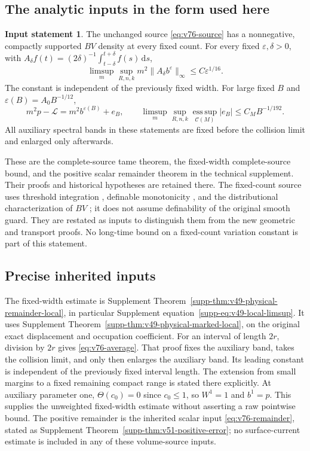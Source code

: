 \documentclass[11pt,reqno]{amsart}
\numberwithin{equation}{section}
\theoremstyle{definition}\newtheorem{definition}[theorem]{Definition}
\theoremstyle{remark}\newtheorem{remark}[theorem]{Remark}
\newcommand{\dd}{\,\mathrm d}\newcommand{\one}{\mathbf1}
\theoremstyle{definition}\newtheorem{inputstatement}[theorem]{Input statement}
\newcommand{\esssup}{\operatorname*{ess\,sup}}
\begin{document}
\subsection{The analytic inputs in the form used here}
\begin{inputstatement}\label{input:v76-analytic}
The unchanged source \eqref{eq:v76-source} has a nonnegative,
compactly supported $BV$ density at every fixed count. For every
fixed $\varepsilon,\delta>0$, with
$A_\delta f(t)=(2\delta)^{-1}\int_{t-\delta}^{t+\delta}f(s)\dd s$,
\begin{equation}\label{eq:v76-average}
 \limsup_m\sup_{R,n,k}m^2\|A_\delta b^\varepsilon\|_\infty
                                      \le C\varepsilon^{1/16}.
\end{equation}
The constant is independent of the previously fixed width. For large
fixed $B$ and $\varepsilon(B)=A_0B^{-1/12}$,
\begin{equation}\label{eq:v76-remainder}
 m^2p-\mathcal L=m^2b^{\varepsilon(B)}+e_B,\qquad
 \limsup_m\sup_{R,n,k}\esssup_{\mathcal C(M)}|e_B|
                                     \le C_MB^{-1/192}.
\end{equation}
All auxiliary spectral bands in these statements are fixed before
the collision limit and enlarged only afterwards.
\end{inputstatement}
These are the complete-source tame theorem, the fixed-width
complete-source bound, and the positive scalar remainder theorem in
the technical supplement. Their proofs and historical hypotheses are
retained there. The fixed-count source uses threshold integration
\cite{CMInt}, definable monotonicity \cite{Coste}, and the
distributional characterization of $BV$ \cite{AFP}; it does not
assume definability of the original smooth guard. They are restated as inputs to distinguish them from
the new geometric and transport proofs. No long-time bound on a
fixed-count variation constant is part of this statement.



\subsection{Precise inherited inputs}\label{sec:v79-input-map}
The fixed-width estimate is Supplement Theorem~\ref{supp-thm:v49-physical-remainder-local},
in particular Supplement equation~\eqref{supp-eq:v49-local-limsup}.
It uses Supplement Theorem~\ref{supp-thm:v49-physical-marked-local}, on the
original exact displacement and occupation coefficient. For an interval
of length $2r$, division by $2r$ gives \eqref{eq:v76-average}. That
proof fixes the auxiliary band, takes the collision limit, and only
then enlarges the auxiliary band. Its leading constant is independent
of the previously fixed interval length. The extension from small
margins to a fixed remaining compact range is stated there explicitly.
At auxiliary parameter one, $\Theta(c_0)=0$ since $c_0\le1$, so $W^1=1$
and $b^1=p$. This supplies the unweighted fixed-width estimate without
asserting a raw pointwise bound. The positive remainder is the inherited
scalar input \eqref{eq:v76-remainder}, stated as Supplement
Theorem~\ref{supp-thm:v51-positive-error}; no surface-current estimate is
included in any of these volume-source inputs.
\end{document}
